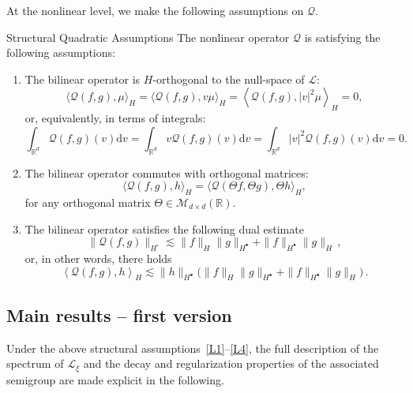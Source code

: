 \documentclass[AHL,Unicode,longabstracts,published]{cedram}
\renewcommand{\d}{\mathrm{d}}
\newcommand{\R}{\mathbb{R}}
\newcommand{\LL}{\mathcal{L}}
\newcommand{\QQ}{\mathcal{Q}}
\newcommand{\MMM}{\mathscr{M}}
\newcommand{\Ss}{H}
\newcommand{\Ssp}{H^{\bullet}}
\newcommand{\Ssm}{H^{\circ}}
\newcommand{\la}{\langle}
\newcommand{\ra}{\rangle}
\newcommand{\lla}{\left\langle}
\newcommand{\rra}{\right\rangle}
\newcommand*{\relabel}{\renewcommand{\labelenumi}{(\theenumi)}}
\newcommand*{\Benumi}{\renewcommand*{\theenumi}{\textbf{B\arabic{enumi}}}\relabel}
\begin{document}
At the nonlinear level, we make the following assumptions on $\QQ$.

\begin{enonce}
{Structural Quadratic Assumptions}\label{AsB1}
The nonlinear operator $\QQ$ is satisfying the following assumptions:
\begin{enumerate}\Benumi
\item \label{Bortho}
The bilinear operator is $\Ss$-orthogonal to the null-space of $\LL$:
\[
\la \QQ(f, g), \mu \ra_{\Ss} = \la \QQ(f, g), v \mu \ra_{\Ss} = \left\la \QQ(f, g), |v|^2 \mu \right\ra_{\Ss} = 0,
\]
or, equivalently, in terms of integrals:
\[
\int_{\R^d} \QQ(f, g)(v) \d v = \int_{\R^d} v \QQ(f, g)(v) \d v = \int_{\R^d} |v|^2 \QQ(f, g)(v) \d v = 0.
\]
\item \label{Bisotrop}
The bilinear operator commutes with orthogonal matrices:
\[
\la \QQ(f, g), h \ra_{\Ss} = \big\la \QQ\left(\Theta f, \Theta g \right), \Theta h \big\ra_{\Ss},
\]
for any orthogonal matrix $\Theta \in \MMM_{d \times d}(\R).$
\item \label{Bbound}
The bilinear operator satisfies the following dual estimate
\[
\| \QQ(f, g) \|_{\Ssm} \lesssim \| f \|_{\Ss} \| g \|_{\Ssp} + \| f \|_{\Ssp} \| g \|_{\Ss}\,,
\]
or, in other words, there holds
\[
\lla \QQ(f, g), h \rra_{\Ss} \lesssim \| h \|_{\Ssp} \big(\| f \|_{\Ss} \| g \|_{\Ssp} + \| f \|_{\Ssp} \| g \|_{\Ss} \big)\,.
\]
\end{enumerate}
\end{enonce}


\subsection{Main results -- first version}

Under the above structural assumptions~\eqref{L1}--\eqref{L4}, the full description of the spectrum of $\LL_{\xi}$ and the decay {and regularization properties} of the associated semigroup are made explicit in the following.
\end{document}
